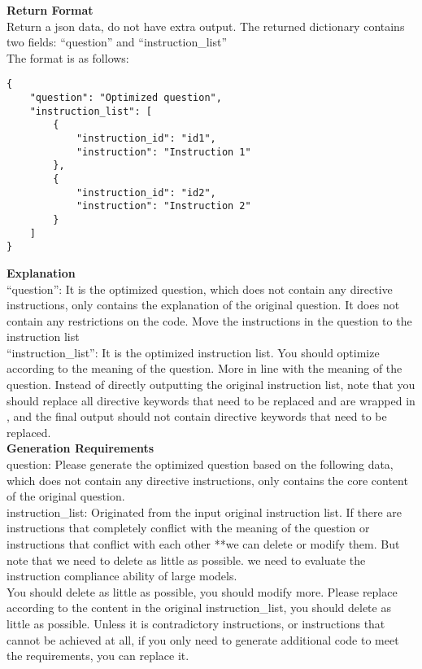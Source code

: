 \begin{tcolorbox}[title=Prompt for Instruction Generation, label={fig:test_generation_prompt}]
\textbf{Return Format}\\
Return a json data, do not have extra output.
The returned dictionary contains two fields: ``question'' and ``instruction\_list''\\
The format is as follows:
\begin{verbatim}
{
    "question": "Optimized question",
    "instruction_list": [
        {
            "instruction_id": "id1",
            "instruction": "Instruction 1"
        },
        {
            "instruction_id": "id2",
            "instruction": "Instruction 2"
        }
    ]
}
\end{verbatim}
\textbf{Explanation}\\
``question'': It is the optimized question, which does not contain any directive instructions, only contains the explanation of the original question. It does not contain any restrictions on the code. Move the instructions in the question to the instruction list\\
``instruction\_list'': It is the optimized instruction list. You should optimize according to the meaning of the question. More in line with the meaning of the question. Instead of directly outputting the original instruction list, note that you should replace all directive keywords that need to be replaced and are wrapped in {{}}, and the final output should not contain directive keywords that need to be replaced.\\
\textbf{Generation Requirements}\\
question: Please generate the optimized question based on the following data, which does not contain any directive instructions, only contains the core content of the original question.\\
instruction\_list: Originated from the input original instruction list. If there are instructions that completely conflict with the meaning of the question or instructions that conflict with each other **we can delete or modify them. But note that we need to delete as little as possible. we need to evaluate the instruction compliance ability of large models.\\
You should delete as little as possible, you should modify more.
Please replace according to the content in the original instruction\_list, you should delete as little as possible. Unless it is contradictory instructions, or instructions that cannot be achieved at all, if you only need to generate additional code to meet the requirements, you can replace it.
\end{tcolorbox}

